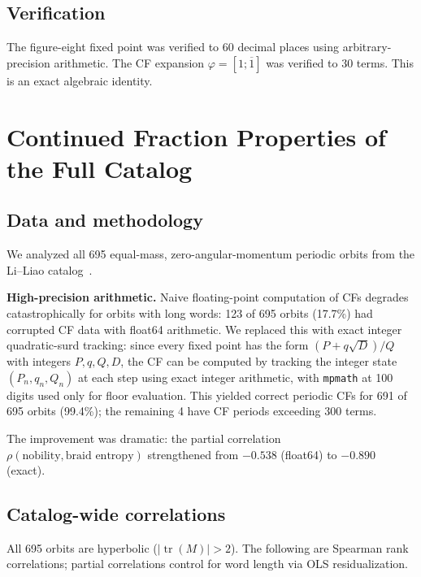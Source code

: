 \documentclass[11pt]{article}
\theoremstyle{definition}
\DeclareMathOperator{\tr}{tr}
\begin{document}
\subsection{Verification}

The figure-eight fixed point was verified to 60 decimal places
using arbitrary-precision arithmetic. The CF expansion
$\varphi = [1; \overline{1}]$ was verified to 30 terms. This is an
exact algebraic identity.


\section{Continued Fraction Properties of the Full Catalog}\label{sec:catalog}

\subsection{Data and methodology}

We analyzed all 695 equal-mass, zero-angular-momentum periodic
orbits from the Li--Liao catalog~\cite{LiLiao2017, LiLiao2019}.

\textbf{High-precision arithmetic.} Naive floating-point computation of CFs
degrades catastrophically for orbits with long words: 123 of 695
orbits (17.7\%) had corrupted CF data with float64 arithmetic. We
replaced this with exact integer quadratic-surd tracking: since every
fixed point has the form $(P + q\sqrt{D})/Q$ with integers
$P, q, Q, D$, the CF can be computed by tracking the integer state
$(P_n, q_n, Q_n)$ at each step using exact integer arithmetic, with
\texttt{mpmath} at 100 digits used only for floor evaluation. This
yielded correct periodic CFs for 691 of 695 orbits (99.4\%); the
remaining 4 have CF periods exceeding 300 terms.

The improvement was dramatic: the partial correlation
$\rho(\text{nobility}, \text{braid entropy})$ strengthened from
$-0.538$ (float64) to $-0.890$ (exact).

\subsection{Catalog-wide correlations}

All 695 orbits are hyperbolic ($|\tr(M)| > 2$). The following are
Spearman rank correlations; partial correlations control for word
length via OLS residualization.
\end{document}
